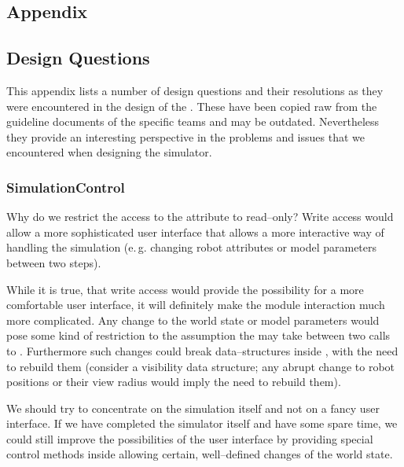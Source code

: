 \newpage
\begin{appendix}
\chapter{Appendix}

\section{Design Questions} \label{sec:questions}
This appendix lists a number of design questions and their resolutions as they were encountered in the design of the \RSS. These have been copied raw from the guideline documents of the specific teams and may be outdated. Nevertheless they provide an interesting perspective in the problems and issues that we encountered when designing the simulator.

\subsection{SimulationControl}

\begin{designQuestion}\label{q:stepInvariant}
Why do we restrict the access to the  attribute to read--only? Write access would allow a more sophisticated user interface that allows a more interactive way of handling the simulation (e.\,g. changing robot attributes or model parameters between two steps).
\end{designQuestion}
\begin{resolution}
While it is true, that write access would provide the possibility for a more comfortable user interface, it will definitely make the module interaction much more complicated. Any change to the world state or model parameters would pose some kind of restriction to the assumption the  may take between two calls to . Furthermore such changes could break data--structures inside , with the need to rebuild them (consider a visibility data structure; any abrupt change to robot positions or their view radius would imply the need to rebuild them).

We should try to concentrate on the simulation itself and not on a fancy user interface. If we have completed the simulator itself and have some spare time, we could still improve the possibilities of the user interface by providing special control methods inside  allowing certain, well--defined changes of the world state.
\end{resolution}


\end{appendix}
